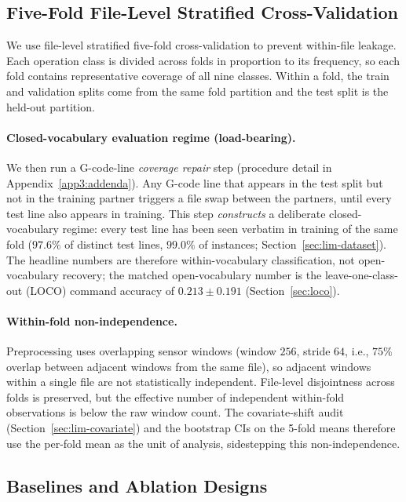 \documentclass[sensors,article,submit,moreauthors,pdftex]{Definitions/mdpi}
\begin{document}
\subsection{Five-Fold File-Level Stratified Cross-Validation}
\label{sec:cv}

We use file-level stratified five-fold cross-validation to prevent within-file leakage. Each operation class is divided across folds in proportion to its frequency, so each fold contains representative coverage of all nine classes. Within a fold, the train and validation splits come from the same fold partition and the test split is the held-out partition.

\paragraph{Closed-vocabulary evaluation regime (load-bearing).} We then run a G-code-line \emph{coverage repair} step (procedure detail in Appendix~\ref{app3:addenda}). Any G-code line that appears in the test split but not in the training partner triggers a file swap between the partners, until every test line also appears in training. This step \emph{constructs} a deliberate closed-vocabulary regime: every test line has been seen verbatim in training of the same fold ($97.6\%$ of distinct test lines, $99.0\%$ of instances; Section~\ref{sec:lim-dataset}). The headline numbers are therefore within-vocabulary classification, not open-vocabulary recovery; the matched open-vocabulary number is the leave-one-class-out (LOCO) command accuracy of $0.213 \pm 0.191$ (Section~\ref{sec:loco}).

\paragraph{Within-fold non-independence.} Preprocessing uses overlapping sensor windows (window $256$, stride $64$, i.e., $75\%$ overlap between adjacent windows from the same file), so adjacent windows within a single file are not statistically independent. File-level disjointness across folds is preserved, but the effective number of independent within-fold observations is below the raw window count. The covariate-shift audit (Section~\ref{sec:lim-covariate}) and the bootstrap CIs on the 5-fold means therefore use the per-fold mean as the unit of analysis, sidestepping this non-independence.

\subsection{Baselines and Ablation Designs}
\label{sec:ablations-design}
\end{document}
